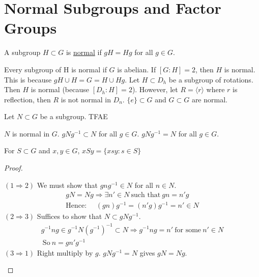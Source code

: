 \documentclass[class=scrartcl, crop=false]{standalone}
\begin{document}
\section{Normal Subgroups and Factor Groups}

\begin{definition}
  A subgroup $H \subset G$ is \ul{normal} if $gH = Hg$ for all $g \in G$.
  \begin{example}
    \begin{enumerate}
      \ii
      Every subgroup of H is normal if $G$ is abelian.
      \ii
      If $[G:H] = 2$, then $H$ is normal. This is because $gH \cup H = G = H \cup Hg$.
      \ii
      Let $H \subset D_h$ be a subgroup of rotations. Then $H$ is normal (because $[D_h:H] = 2 $). However, let $R = \langle r \rangle $ where $r$ is reflection, then $R$ is not normal in $D_n$.
      \ii
      $\{e\} \subset G$ and $G \subset G$ are normal.
    \end{enumerate}
  \end{example}
\end{definition}
\begin{theorem}
  Let $N \subset G$ be a subgroup. TFAE
  \begin{enumerate}
    \ii 
    $N$ is normal in $G$.
    \ii
    $gNg^{-1} \subset N$ for all $g \in G$.
    \ii
    $gNg^{-1} = N$ for all $g \in G$.
  \end{enumerate}
  \begin{note}
    For $S \subset G$ and $x,y \in G$, $xSy = \{xsy: s \in S\}$
  \end{note}
  \begin{proof}
    \begin{enumerate}
      \ii[]
      \ii[] $(1 \Rightarrow 2)$
      We must show that $gng^{-1} \in N$ for all $n \in N$.
      \begin{gather*}
        gN = Ng \Rightarrow \exists n' \in N \ \text{such that} \ gn = n'g \\
        \text{Hence: } \quad (gn)g^{-1} = (n'g)g^{-1} = n' \in N
      \end{gather*}
      \ii[] $(2 \Rightarrow 3)$
      Suffices to show that $N \subset gNg^{-1}$.
      \begin{gather*}
        g^{-1}ng \in g^{-1}N(g^{-1})^{-1} \subset N \Rightarrow g^{-1}ng = n' \ \text{for some} \ n' \in N \\
        \ \text{So} \ n = gn'g^{-1}
      \end{gather*}
      \ii[] $(3 \Rightarrow 1)$ 
      Right multiply by $g$. $gNg^{-1} = N$ gives $gN = Ng$.
    \end{enumerate}
  \end{proof}
\end{theorem}
\end{document}
